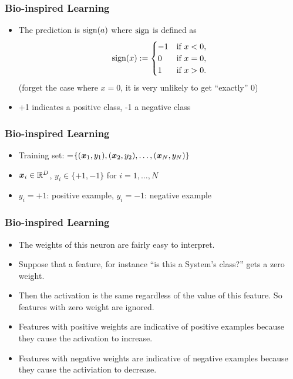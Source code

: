 \documentclass[trans]{beamer}
\begin{document}
\begin{frame}
  \frametitle{Bio-inspired Learning}
\begin{itemize}
\item The prediction is $\textrm{sign}(a)$ where $\textrm{sign}$ is defined as
$$\textrm{sign}(x) := \begin{cases}
-1 & \text{if } x < 0, \\
0 & \text{if } x = 0, \\
1 & \text{if } x > 0. \end{cases}$$
(forget the case where $x=0$, it is very unlikely to get ``exactly'' 0)
\item +1 indicates a positive class, -1 a negative class
\end{itemize}

\end{frame}

\begin{frame}
  \frametitle{Bio-inspired Learning}
\begin{itemize}
\item Training set: =$\{({\boldsymbol{x}}_1,y_1),
({\boldsymbol{x}}_2,y_2), \dots, ({\boldsymbol{x}}_N,y_N)\}$
\item ${\boldsymbol{x}}_i\in \mathbb{R}^D$, $y_i\in \{+1,-1\}$ for $i=1,\ldots,N$
\item $y_i=+1$: positive example, $y_i=-1$: negative example
\end{itemize}

\end{frame}

\begin{frame}
  \frametitle{Bio-inspired Learning}
\begin{itemize}
\item
The weights of this neuron are fairly easy to interpret.
\item  Suppose that
a feature, for instance ``is this a System's class?'' gets a zero
weight. 
\item Then the activation is the same regardless of the value of
this feature.  So features with zero weight are ignored.  
\item Features
with positive weights are indicative of positive examples because they
cause the activation to increase.
\item  Features with negative weights are
indicative of negative examples because they cause the activiation to
decrease.
\end{itemize}
\end{frame}
\end{document}
